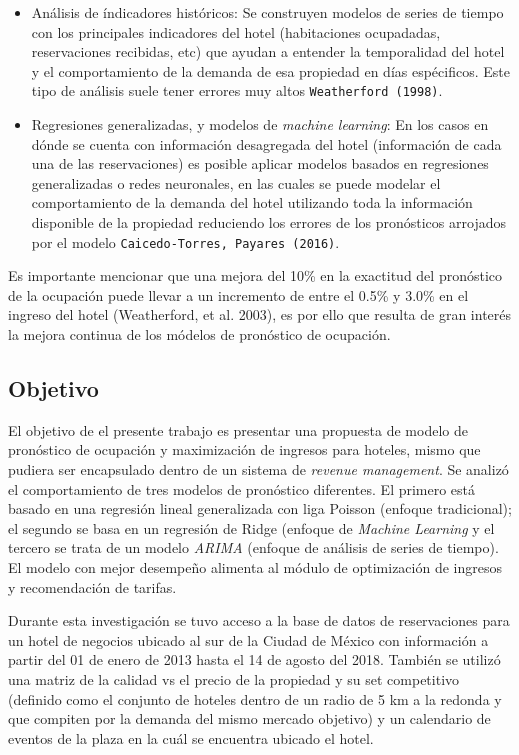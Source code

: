 \begin{itemize}
  \item Análisis de índicadores históricos: Se construyen modelos de series de tiempo con los principales indicadores del hotel (habitaciones ocupadadas, reservaciones recibidas, etc) que ayudan a entender la temporalidad del hotel y el comportamiento de la demanda de esa propiedad en días espécificos. Este tipo de análisis suele tener errores muy altos \texttt{Weatherford (1998)}.
  \item Regresiones generalizadas, y modelos de \emph{machine learning}: En los casos en dónde se cuenta con información desagregada del hotel (información de cada una de las reservaciones) es posible aplicar modelos basados en regresiones generalizadas o redes neuronales, en las cuales se puede modelar el comportamiento de la demanda del hotel utilizando toda la información disponible de la propiedad reduciendo los errores de los pronósticos arrojados por el modelo \texttt{Caicedo-Torres, Payares (2016)}.
\end{itemize}
Es importante mencionar que una mejora del 10\% en la exactitud del pronóstico de la ocupación puede llevar a un incremento de entre el 0.5\% y 3.0\% en el ingreso del hotel (Weatherford, et al. 2003), es por ello que resulta de gran interés la mejora continua de los módelos de pronóstico de ocupación.
\subsection*{Objetivo}
El objetivo de el presente trabajo es presentar una propuesta de modelo de pronóstico de ocupación y maximización de ingresos para hoteles, mismo que pudiera ser encapsulado dentro de un sistema de \emph{revenue management}. Se analizó el comportamiento de tres modelos de pronóstico diferentes. El primero está basado en una regresión lineal generalizada con liga Poisson (enfoque tradicional); el segundo se basa en un regresión de Ridge (enfoque de \emph{Machine Learning} y el tercero se trata de un modelo \emph{ARIMA} (enfoque de análisis de series de tiempo). El modelo con mejor desempeño alimenta al módulo de optimización de ingresos y recomendación de tarifas.

Durante esta investigación se tuvo acceso a la base de datos de reservaciones para un hotel de negocios ubicado al sur de la Ciudad de México con información a partir del 01 de enero de 2013 hasta el 14 de agosto del 2018. También se utilizó una matriz de la calidad vs el precio de la propiedad y su set competitivo (definido como el conjunto de hoteles dentro de un radio de 5 km a la redonda y que compiten por la demanda del mismo mercado objetivo) y un calendario de eventos de la plaza en la cuál se encuentra ubicado el hotel.


